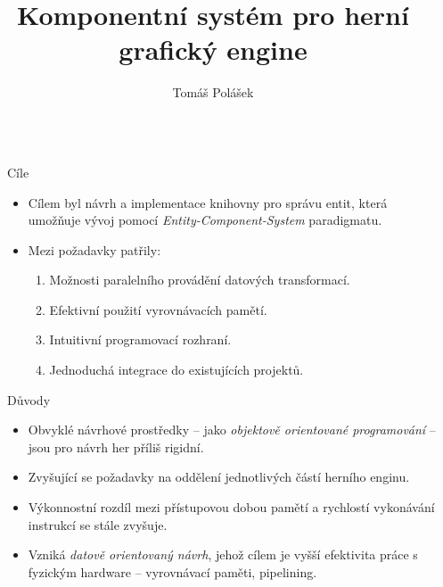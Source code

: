 \documentclass[final,hyperref={pdfpagelabels=false}]{beamer}
\title{\huge Komponentní systém pro herní grafický engine} %
\author{Tomáš Polášek} %
\institute{Vysoké učení technické v Brně -- Fakulta informačních technologií} %
\begin{document}

\begin{frame}[t, fragile] %

\begin{columns}[t] %

\begin{column}{.02\textwidth}\end{column} %

\begin{column}{.465\textwidth} %


\begin{block}{Cíle}

\begin{itemize}
	\item Cílem byl návrh a implementace knihovny pro správu entit, která umožňuje vývoj pomocí \emph{Entity-Component-System} paradigmatu.
	\item Mezi požadavky patřily:
	\begin{enumerate}
		\item Možnosti paralelního provádění datových transformací.
		\item Efektivní použití vyrovnávacích pamětí.
		\item Intuitivní programovací rozhraní.
		\item Jednoduchá integrace do existujících projektů.
	\end{enumerate}
\end{itemize}


\end{block}


\begin{block}{Důvody}

\begin{itemize}
	\item Obvyklé návrhové prostředky -- jako \emph{objektově orientované programování} -- jsou pro návrh her příliš rigidní. 
	\item Zvyšující se požadavky na oddělení jednotlivých částí herního enginu.
	\item Výkonnostní rozdíl mezi přístupovou dobou pamětí a rychlostí vykonávání instrukcí se stále zvyšuje. 
	\item Vzniká \emph{datově orientovaný návrh}, jehož cílem je vyšší efektivita práce s fyzickým hardware -- vyrovnávací paměti, pipelining.
\end{itemize}


\end{block}
\end{column}
\end{columns}
\end{frame}
\end{document}
